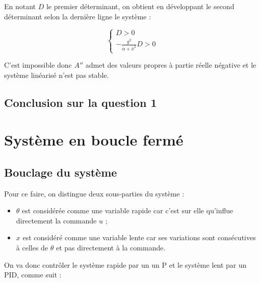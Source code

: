 \documentclass[10pt]{article}
\begin{document}
\vspace{10px}

\noindent En notant $D$ le premier déterminant, on obtient en développant le second déterminant selon la dernière
ligne le système :

\[
	\begin{cases}
		D > 0 \\
		- \frac{g^2}{\alpha + \bar x^2} D > 0
	\end{cases}
\]

\noindent C'est impossible donc $A''$ admet des valeurs propres à partie réelle négative et le système linéarisé n'est
pas stable.

\subsection*{Conclusion sur la question 1}


\section{Système en boucle fermé}

\newcommand{\kt}{k_{\theta}}
\newcommand{\kdx}{k^d_x}
\newcommand{\kdt}{k^d_{\theta}}
\newcommand{\fact}[1]{\frac{g #1 }{\alpha + \bar x^2}} %

\subsection*{Bouclage du système}

\noindent Pour ce faire, on distingue deux sous-parties du système :

\begin{itemize}
	\item $\theta$ est considérée comme une variable rapide car c'est sur elle qu'influe directement la commande $u$ ;
	\item $x$ est considéré comme une variable lente car ses variations sont consécutives à celles de $\theta$ et
	pas directement à la commande.
\end{itemize}

\noindent On va donc contrôler le système rapide par un un P et le système lent par un PID, comme suit :
\end{document}
